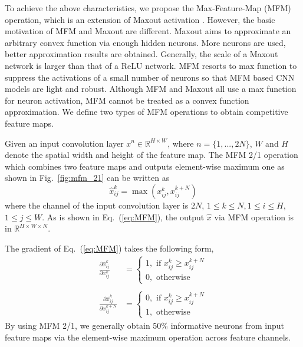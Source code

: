 \documentclass[journal,transmag]{IEEEtran}
\begin{document}
To achieve the above characteristics, we propose the Max-Feature-Map (MFM) operation, which is an extension of Maxout activation \cite{goodfellow2013maxout}. However, the basic motivation of MFM and Maxout are different. Maxout aims to approximate an arbitrary convex function via enough hidden neurons. More neurons are used, better approximation results are obtained. Generally, the scale of a Maxout network is larger than that of a ReLU network. MFM resorts to max function to suppress the activations of a small number of neurons so that MFM based CNN models are light and robust. Although MFM and Maxout all use a max function for neuron activation, MFM cannot be treated as a convex function approximation. We define two types of MFM operations to obtain competitive feature maps.


Given an input convolution layer $x^n \in \mathbb{R}^{H\times W}$, where $n=\{1,...,2N\}$, $W$ and $H$ denote the spatial width and height of the feature map. The MFM 2/1 operation which combines two feature maps and outputs element-wise maximum one as shown in Fig.~\ref{fig:mfm_21} can be written as
\begin{equation}
\hat{x}^{k}_{ij}=\max(x^{k}_{ij}, x^{k+N}_{ij})
\label{eq:MFM}
\end{equation}
where the channel of the input convolution layer is $2N$, $1 \leq k \leq N, 1\leq i \leq H$, $1\leq j\leq W$. As is shown in Eq.~(\ref{eq:MFM}), the output $\hat{x}$ via MFM operation is in $\mathbb{R}^{H\times W \times N}$.


The gradient of Eq.~(\ref{eq:MFM}) takes the following form,
\begin{equation}
\begin{array}{cl}
\frac{\partial{\hat{x}^k_{ij}}}{\partial{x^{k}_{ij}}} &= \left\{
    \begin{array}{l}
    1, \text{ if } x^{k}_{ij}\geq x^{k+N}_{ij}\\
    0, \text{ otherwise}
    \end{array}
\right. \\
\\
\frac{\partial{\hat{x}^k_{ij}}}{\partial{x^{k+N}_{ij}}} &= \left\{
    \begin{array}{l}
    0, \text{ if } x^{k}_{ij}\geq x^{k+N}_{ij}\\
    1, \text{ otherwise}
    \end{array}
\right.
\end{array}
\label{eq:MFM_gradient}
\end{equation}
By using MFM 2/1, we generally obtain 50\% informative neurons from input feature maps via the element-wise maximum operation across feature channels.
\end{document}
